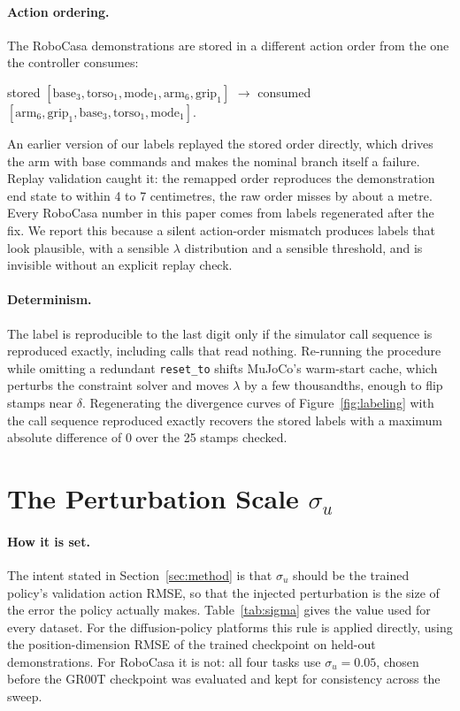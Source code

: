 \paragraph{Action ordering.}
The RoboCasa demonstrations are stored in a different action order from the one
the controller consumes:
\begin{center}
\small
stored $[\text{base}_3, \text{torso}_1, \text{mode}_1, \text{arm}_6, \text{grip}_1]$
\quad$\rightarrow$\quad
consumed $[\text{arm}_6, \text{grip}_1, \text{base}_3, \text{torso}_1, \text{mode}_1]$.
\end{center}
An earlier version of our labels replayed the stored order directly, which
drives the arm with base commands and makes the nominal branch itself a failure.
Replay validation caught it: the remapped order reproduces the demonstration
end state to within 4 to 7 centimetres, the raw order misses by about a metre.
Every RoboCasa number in this paper comes from labels regenerated after the fix.
We report this because a silent action-order mismatch produces labels that look
plausible, with a sensible $\lambda$ distribution and a sensible threshold, and
is invisible without an explicit replay check.

\paragraph{Determinism.}
The label is reproducible to the last digit only if the simulator call sequence
is reproduced exactly, including calls that read nothing. Re-running the
procedure while omitting a redundant \texttt{reset\_to} shifts MuJoCo's
warm-start cache, which perturbs the constraint solver and moves $\lambda$ by a
few thousandths, enough to flip stamps near $\delta$. Regenerating the
divergence curves of Figure~\ref{fig:labeling} with the call sequence
reproduced exactly recovers the stored labels with a maximum absolute
difference of $0$ over the 25 stamps checked.

\section{The Perturbation Scale $\sigma_u$}
\label{app:sigma}

\paragraph{How it is set.}
The intent stated in Section~\ref{sec:method} is that $\sigma_u$ should be the
trained policy's validation action RMSE, so that the injected perturbation is
the size of the error the policy actually makes. Table~\ref{tab:sigma} gives
the value used for every dataset. For the diffusion-policy platforms this rule
is applied directly, using the position-dimension RMSE of the trained
checkpoint on held-out demonstrations. For RoboCasa it is not: all four tasks
use $\sigma_u{=}0.05$, chosen before the GR00T checkpoint was evaluated and
kept for consistency across the sweep.

